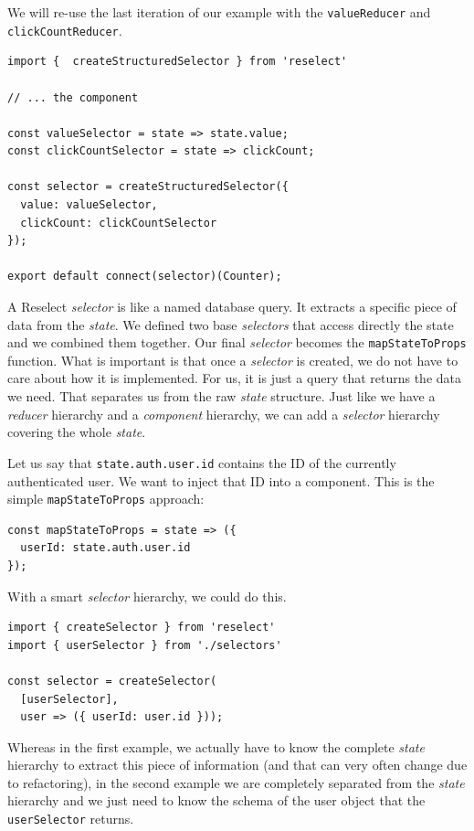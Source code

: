 We will re-use the last iteration of our example with the \texttt{valueReducer} and \texttt{clickCountReducer}.

\begin{verbatim}
import {  createStructuredSelector } from 'reselect'

// ... the component

const valueSelector = state => state.value;
const clickCountSelector = state => clickCount;

const selector = createStructuredSelector({
  value: valueSelector,
  clickCount: clickCountSelector
});

export default connect(selector)(Counter);
\end{verbatim}

A Reselect \emph{selector} is like a named database query. It extracts a specific piece of data from the \emph{state}. We defined two base \emph{selectors} that access directly the state and we combined them together. Our final \emph{selector} becomes the \texttt{mapStateToProps} function. What is important is that once a \emph{selector} is created, we do not have to care about how it is implemented. For us, it is just a query that returns the data we need. That separates us from the raw \emph{state} structure. Just like we have a \emph{reducer} hierarchy and a \emph{component} hierarchy, we can add a \emph{selector} hierarchy covering the whole \emph{state}.

Let us say that \texttt{state.auth.user.id} contains the ID of the currently authenticated user. We want to inject that ID into a component. This is the simple \texttt{mapStateToProps} approach:

\begin{verbatim}
const mapStateToProps = state => ({
  userId: state.auth.user.id
});
\end{verbatim}

With a smart \emph{selector} hierarchy, we could do this.

\begin{verbatim}
import { createSelector } from 'reselect'
import { userSelector } from './selectors'

const selector = createSelector(
  [userSelector],
  user => ({ userId: user.id }));
\end{verbatim}

Whereas in the first example, we actually have to know the complete \emph{state} hierarchy to extract this piece of information (and that can very often change due to refactoring), in the second example we are completely separated from the \emph{state} hierarchy and we just need to know the schema of the user object that the \texttt{userSelector} returns.

